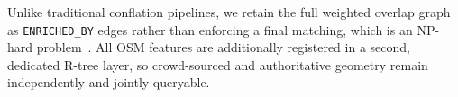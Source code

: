 \documentclass[sigconf,authordraft]{acmart}
\begin{document}
%
Unlike traditional conflation pipelines, we retain the full weighted overlap graph as \texttt{ENRICHED\_BY} edges rather than enforcing a final matching, which is an NP-hard problem~\cite{naumann_nnmatching_2024}. 
All OSM features are additionally registered in a second, dedicated R-tree layer, so crowd-sourced and authoritative geometry remain independently and jointly queryable.

\end{document}
